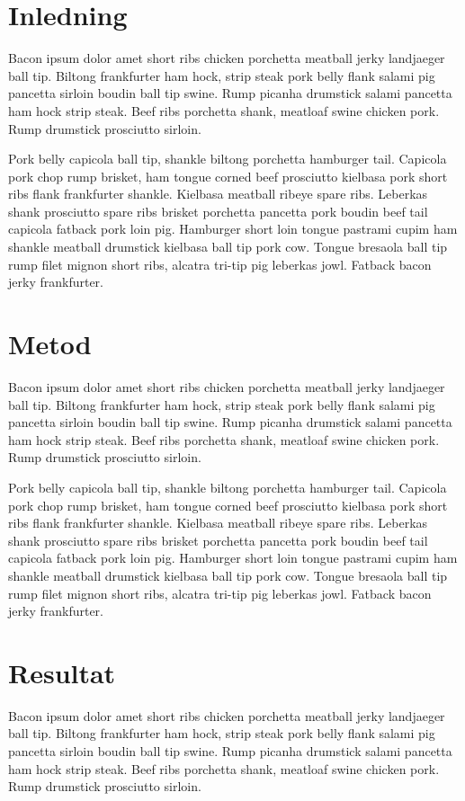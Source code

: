 \documentclass[10pt, titlepage, oneside, a4paper]{article}
\begin{document}
    
	\section{Inledning}
        Bacon ipsum dolor amet short ribs chicken porchetta meatball jerky landjaeger ball tip. Biltong frankfurter ham hock, strip steak pork belly flank salami pig pancetta sirloin boudin ball tip swine. Rump picanha drumstick salami pancetta ham hock strip steak. Beef ribs porchetta shank, meatloaf swine chicken pork. Rump drumstick prosciutto sirloin.

Pork belly capicola ball tip, shankle biltong porchetta hamburger tail. Capicola pork chop rump brisket, ham tongue corned beef prosciutto kielbasa pork short ribs flank frankfurter shankle. Kielbasa meatball ribeye spare ribs. Leberkas shank prosciutto spare ribs brisket porchetta pancetta pork boudin beef tail capicola fatback pork loin pig. Hamburger short loin tongue pastrami cupim ham shankle meatball drumstick kielbasa ball tip pork cow. Tongue bresaola ball tip rump filet mignon short ribs, alcatra tri-tip pig leberkas jowl. Fatback bacon jerky frankfurter.
	\section{Metod}
        Bacon ipsum dolor amet short ribs chicken porchetta meatball jerky landjaeger ball tip. Biltong frankfurter ham hock, strip steak pork belly flank salami pig pancetta sirloin boudin ball tip swine. Rump picanha drumstick salami pancetta ham hock strip steak. Beef ribs porchetta shank, meatloaf swine chicken pork. Rump drumstick prosciutto sirloin.

Pork belly capicola ball tip, shankle biltong porchetta hamburger tail. Capicola pork chop rump brisket, ham tongue corned beef prosciutto kielbasa pork short ribs flank frankfurter shankle. Kielbasa meatball ribeye spare ribs. Leberkas shank prosciutto spare ribs brisket porchetta pancetta pork boudin beef tail capicola fatback pork loin pig. Hamburger short loin tongue pastrami cupim ham shankle meatball drumstick kielbasa ball tip pork cow. Tongue bresaola ball tip rump filet mignon short ribs, alcatra tri-tip pig leberkas jowl. Fatback bacon jerky frankfurter.
	\section{Resultat}
        Bacon ipsum dolor amet short ribs chicken porchetta meatball jerky landjaeger ball tip. Biltong frankfurter ham hock, strip steak pork belly flank salami pig pancetta sirloin boudin ball tip swine. Rump picanha drumstick salami pancetta ham hock strip steak. Beef ribs porchetta shank, meatloaf swine chicken pork. Rump drumstick prosciutto sirloin.
\end{document}

